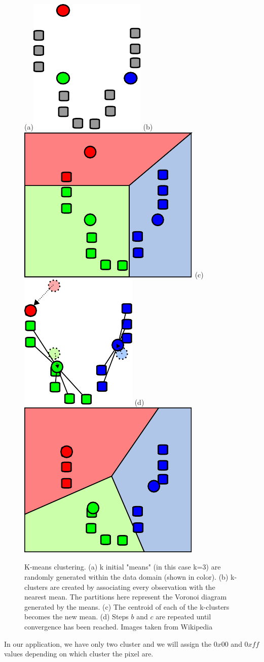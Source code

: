 \begin{figure}[htb] %
   \centering
   (a)\includegraphics[width=0.20\linewidth]{images/K_Means_Example_Step_1.pdf}\hfill
   (b)\includegraphics[width=0.20\linewidth]{images/K_Means_Example_Step_2.pdf}\hfill
   (c)\includegraphics[width=0.20\linewidth]{images/K_Means_Example_Step_3.pdf}\hfill
   (d)\includegraphics[width=0.20\linewidth]{images/K_Means_Example_Step_4.pdf}
   \caption[K-means clustering]{K-means clustering. (a) k initial "means" (in this case k=3) are randomly generated within the data domain (shown in color). (b) k-clusters are created by associating every observation with the nearest mean. The partitions here represent the Voronoi diagram generated by the means. (c) The centroid of each of the k-clusters becomes the new mean. (d) Steps $b$ and $c$ are repeated until convergence has been reached. Images taken from Wikipedia}
   \label{fig:kmeans}
\end{figure}

In our application, we have only two cluster and we will assign the $0x00$ and $0xff$ values depending on which cluster the pixel are.

